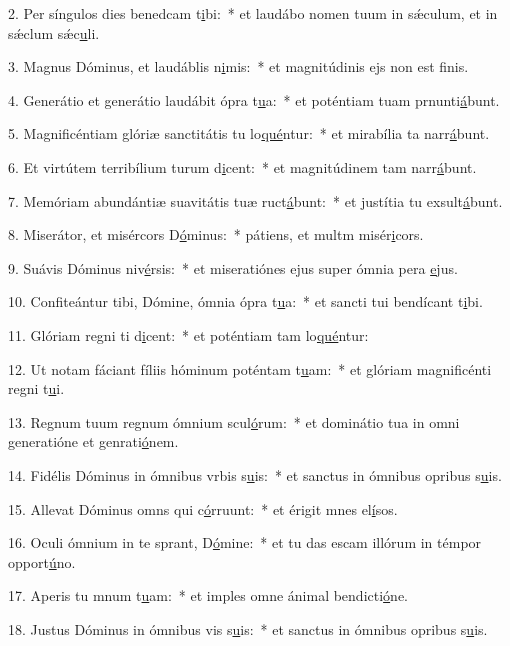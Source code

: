 2. Per síngulos dies benedcam t\uline{i}bi:~* et laudábo nomen tuum in sǽculum, et in sǽclum sǽc\uline{u}li.\par 
3. Magnus Dóminus, et laudáblis n\uline{i}mis:~* et magnitúdinis ejs non est f\uline{i}nis.\par 
4. Generátio et generátio laudábit ópra t\uline{u}a:~* et poténtiam tuam prnunti\uline{á}bunt.\par 
5. Magnificéntiam glóriæ sanctitátis tu lo\uline{qué}ntur:~* et mirabília ta narr\uline{á}bunt.\par 
6. Et virtútem terribílium turum d\uline{i}cent:~* et magnitúdinem tam narr\uline{á}bunt.\par 
7. Memóriam abundántiæ suavitátis tuæ ruct\uline{á}bunt:~* et justítia tu exsult\uline{á}bunt.\par 
8. Miserátor, et misércors D\uline{ó}minus:~* pátiens, et multm misér\uline{i}cors.\par 
9. Suávis Dóminus niv\uline{é}rsis:~* et miseratiónes ejus super ómnia pera \uline{e}jus.\par 
10. Confiteántur tibi, Dómine, ómnia ópra t\uline{u}a:~* et sancti tui bendícant t\uline{i}bi.\par 
11. Glóriam regni ti d\uline{i}cent:~* et poténtiam tam lo\uline{qué}ntur:\par 
12. Ut notam fáciant fíliis hóminum poténtam t\uline{u}am:~* et glóriam magnificénti regni t\uline{u}i.\par 
13. Regnum tuum regnum ómnium scul\uline{ó}rum:~* et dominátio tua in omni generatióne et genrati\uline{ó}nem.\par 
14. Fidélis Dóminus in ómnibus vrbis s\uline{u}is:~* et sanctus in ómnibus opribus s\uline{u}is.\par 
15. Allevat Dóminus omns qui c\uline{ó}rruunt:~* et érigit mnes el\uline{í}sos.\par 
16. Oculi ómnium in te sprant, D\uline{ó}mine:~* et tu das escam illórum in témpor opport\uline{ú}no.\par 
17. Aperis tu mnum t\uline{u}am:~* et imples omne ánimal bendicti\uline{ó}ne.\par 
18. Justus Dóminus in ómnibus vis s\uline{u}is:~* et sanctus in ómnibus opribus s\uline{u}is.\par 
